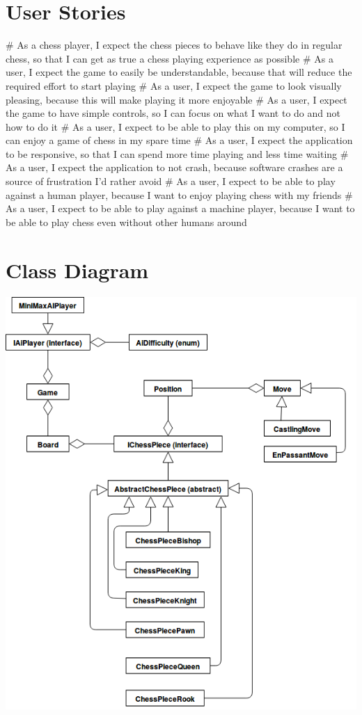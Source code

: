 \documentclass{article}
\begin{document}
\section*{User Stories}

\begin{easylist}[itemize]
# As a chess player, I expect the chess pieces to behave like they do in regular chess, so that I can get as true a chess playing experience as possible
# As a user, I expect the game to easily be understandable, because that will reduce the required effort to start playing
# As a user, I expect the game to look visually pleasing, because this will make playing it more enjoyable
# As a user, I expect the game to have simple controls, so I can focus on what I want to do and not how to do it
# As a user, I expect to be able to play this on my computer, so I can enjoy a game of chess in my spare time
# As a user, I expect the application to be responsive, so that I can spend more time playing and less time waiting
# As a user, I expect the application to not crash, because software crashes are a source of frustration I'd rather avoid
# As a user, I expect to be able to play against a human player, because I want to enjoy playing chess with my friends
# As a user, I expect to be able to play against a machine player, because I want to be able to play chess even without other humans around
\end{easylist}

\section*{Class Diagram}
\includegraphics[width=15cm]{classdiagram-v2}
\end{document}
